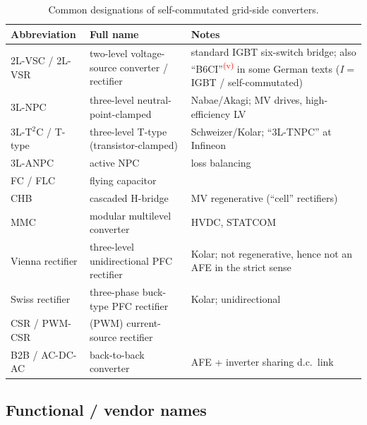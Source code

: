 \documentclass[11pt,a4paper]{article}
\newcommand{\verify}{\textsuperscript{\textcolor{red}{(v)}}}
\begin{document}
\begin{table}[htb]
\centering
\caption{Common designations of self-commutated grid-side converters.}
\small
\begin{tabular}{p{3.2cm}p{3.6cm}p{7cm}}
\toprule
Abbreviation & Full name & Notes \\
\midrule
2L-VSC / 2L-VSR & two-level voltage-source converter / rectifier & standard IGBT six-switch bridge; also ``B6CI''\verify{} in some German texts (\emph{I} = IGBT / self-commutated) \\
3L-NPC & three-level neutral-point-clamped & Nabae/Akagi; MV drives, high-efficiency LV \\
3L-T$^2$C / T-type & three-level T-type (transistor-clamped) & Schweizer/Kolar; ``3L-TNPC'' at Infineon \\
3L-ANPC & active NPC & loss balancing \\
FC / FLC & flying capacitor & \\
CHB & cascaded H-bridge & MV regenerative (``cell'' rectifiers) \\
MMC & modular multilevel converter & HVDC, STATCOM \\
Vienna rectifier & three-level unidirectional PFC rectifier & Kolar; not regenerative, hence not an AFE in the strict sense \\
Swiss rectifier & three-phase buck-type PFC rectifier & Kolar; unidirectional \\
CSR / PWM-CSR & (PWM) current-source rectifier & \\
B2B / AC-DC-AC & back-to-back converter & AFE + inverter sharing d.c.\ link \\
\bottomrule
\end{tabular}
\end{table}

\subsection{Functional / vendor names}
\end{document}
